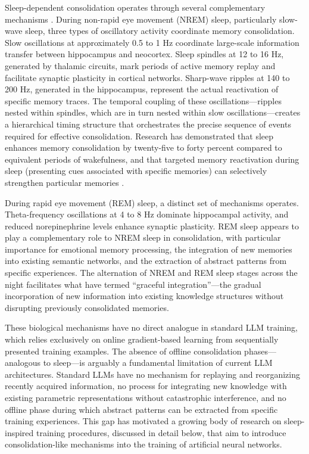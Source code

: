 \documentclass[11pt,letterpaper]{article}
\begin{document}
Sleep-dependent consolidation operates through several complementary mechanisms \cite{diekelmann2010memory}. During non-rapid eye movement (NREM) sleep, particularly slow-wave sleep, three types of oscillatory activity coordinate memory consolidation. Slow oscillations at approximately 0.5 to 1 Hz coordinate large-scale information transfer between hippocampus and neocortex. Sleep spindles at 12 to 16 Hz, generated by thalamic circuits, mark periods of active memory replay and facilitate synaptic plasticity in cortical networks. Sharp-wave ripples at 140 to 200 Hz, generated in the hippocampus, represent the actual reactivation of specific memory traces. The temporal coupling of these oscillations---ripples nested within spindles, which are in turn nested within slow oscillations---creates a hierarchical timing structure that orchestrates the precise sequence of events required for effective consolidation. Research has demonstrated that sleep enhances memory consolidation by twenty-five to forty percent compared to equivalent periods of wakefulness, and that targeted memory reactivation during sleep (presenting cues associated with specific memories) can selectively strengthen particular memories \cite{rasch2013sleep}.

During rapid eye movement (REM) sleep, a distinct set of mechanisms operates. Theta-frequency oscillations at 4 to 8 Hz dominate hippocampal activity, and reduced norepinephrine levels enhance synaptic plasticity. REM sleep appears to play a complementary role to NREM sleep in consolidation, with particular importance for emotional memory processing, the integration of new memories into existing semantic networks, and the extraction of abstract patterns from specific experiences. The alternation of NREM and REM sleep stages across the night facilitates what \cite{gonzalez2022model} have termed ``graceful integration''---the gradual incorporation of new information into existing knowledge structures without disrupting previously consolidated memories.

These biological mechanisms have no direct analogue in standard LLM training, which relies exclusively on online gradient-based learning from sequentially presented training examples. The absence of offline consolidation phases---analogous to sleep---is arguably a fundamental limitation of current LLM architectures. Standard LLMs have no mechanism for replaying and reorganizing recently acquired information, no process for integrating new knowledge with existing parametric representations without catastrophic interference, and no offline phase during which abstract patterns can be extracted from specific training experiences. This gap has motivated a growing body of research on sleep-inspired training procedures, discussed in detail below, that aim to introduce consolidation-like mechanisms into the training of artificial neural networks.
\end{document}
